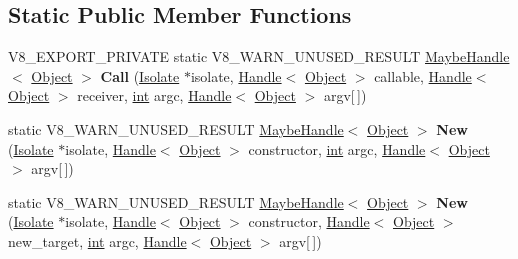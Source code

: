\subsection*{Static Public Member Functions}
\begin{DoxyCompactItemize}
\item 
\mbox{\label{classv8_1_1internal_1_1Execution_ab0d46a6f39b3b195d49ffb2c4bfd89c8}} 
V8\+\_\+\+E\+X\+P\+O\+R\+T\+\_\+\+P\+R\+I\+V\+A\+TE static V8\+\_\+\+W\+A\+R\+N\+\_\+\+U\+N\+U\+S\+E\+D\+\_\+\+R\+E\+S\+U\+LT \mbox{\hyperlink{classv8_1_1internal_1_1MaybeHandle}{Maybe\+Handle}}$<$ \mbox{\hyperlink{classv8_1_1internal_1_1Object}{Object}} $>$ {\bfseries Call} (\mbox{\hyperlink{classv8_1_1internal_1_1Isolate}{Isolate}} $\ast$isolate, \mbox{\hyperlink{classv8_1_1internal_1_1Handle}{Handle}}$<$ \mbox{\hyperlink{classv8_1_1internal_1_1Object}{Object}} $>$ callable, \mbox{\hyperlink{classv8_1_1internal_1_1Handle}{Handle}}$<$ \mbox{\hyperlink{classv8_1_1internal_1_1Object}{Object}} $>$ receiver, \mbox{\hyperlink{classint}{int}} argc, \mbox{\hyperlink{classv8_1_1internal_1_1Handle}{Handle}}$<$ \mbox{\hyperlink{classv8_1_1internal_1_1Object}{Object}} $>$ argv\mbox{[}$\,$\mbox{]})
\item 
\mbox{\label{classv8_1_1internal_1_1Execution_af4ea7e8e93a6964e89c7b60fcb99f99e}} 
static V8\+\_\+\+W\+A\+R\+N\+\_\+\+U\+N\+U\+S\+E\+D\+\_\+\+R\+E\+S\+U\+LT \mbox{\hyperlink{classv8_1_1internal_1_1MaybeHandle}{Maybe\+Handle}}$<$ \mbox{\hyperlink{classv8_1_1internal_1_1Object}{Object}} $>$ {\bfseries New} (\mbox{\hyperlink{classv8_1_1internal_1_1Isolate}{Isolate}} $\ast$isolate, \mbox{\hyperlink{classv8_1_1internal_1_1Handle}{Handle}}$<$ \mbox{\hyperlink{classv8_1_1internal_1_1Object}{Object}} $>$ constructor, \mbox{\hyperlink{classint}{int}} argc, \mbox{\hyperlink{classv8_1_1internal_1_1Handle}{Handle}}$<$ \mbox{\hyperlink{classv8_1_1internal_1_1Object}{Object}} $>$ argv\mbox{[}$\,$\mbox{]})
\item 
\mbox{\label{classv8_1_1internal_1_1Execution_aa03806bab8b5ac5c579fa7c27cf9d823}} 
static V8\+\_\+\+W\+A\+R\+N\+\_\+\+U\+N\+U\+S\+E\+D\+\_\+\+R\+E\+S\+U\+LT \mbox{\hyperlink{classv8_1_1internal_1_1MaybeHandle}{Maybe\+Handle}}$<$ \mbox{\hyperlink{classv8_1_1internal_1_1Object}{Object}} $>$ {\bfseries New} (\mbox{\hyperlink{classv8_1_1internal_1_1Isolate}{Isolate}} $\ast$isolate, \mbox{\hyperlink{classv8_1_1internal_1_1Handle}{Handle}}$<$ \mbox{\hyperlink{classv8_1_1internal_1_1Object}{Object}} $>$ constructor, \mbox{\hyperlink{classv8_1_1internal_1_1Handle}{Handle}}$<$ \mbox{\hyperlink{classv8_1_1internal_1_1Object}{Object}} $>$ new\+\_\+target, \mbox{\hyperlink{classint}{int}} argc, \mbox{\hyperlink{classv8_1_1internal_1_1Handle}{Handle}}$<$ \mbox{\hyperlink{classv8_1_1internal_1_1Object}{Object}} $>$ argv\mbox{[}$\,$\mbox{]})

\end{DoxyCompactItemize}
